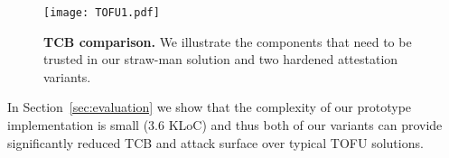 \else

\begin{figure}[t]
 \centering
  \texttt{[image: TOFU1.pdf]}
 \caption{\textbf{TCB comparison.} We illustrate the components that need to be trusted in our straw-man solution and two hardened attestation variants.}
 \label{fig:TOFU}
\end{figure}

\fi

In Section~\ref{sec:evaluation} we show that the complexity of our prototype implementation is small (3.6 KLoC) and thus both of our variants can provide significantly reduced TCB and attack surface over typical TOFU solutions.
